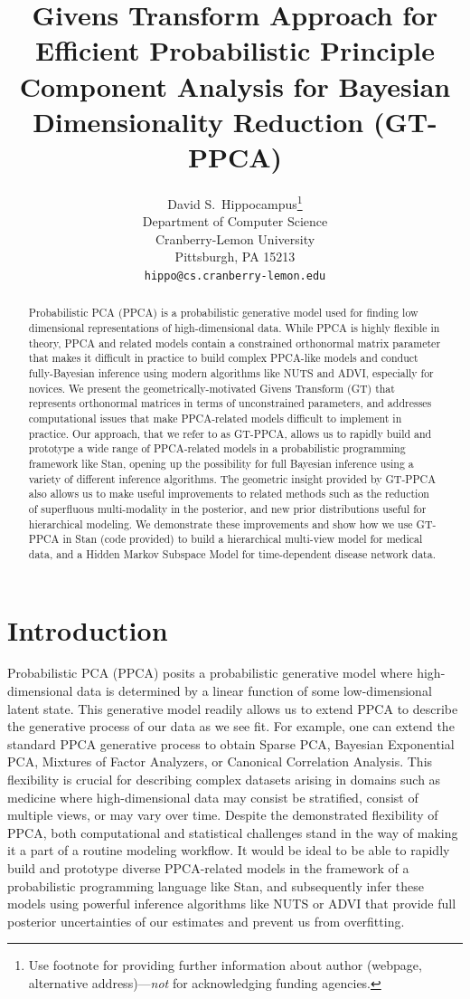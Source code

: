 \documentclass{article}
\title{Givens Transform Approach for Efficient Probabilistic Principle Component Analysis for Bayesian Dimensionality Reduction (GT-PPCA)}
\author{
  David S.~Hippocampus\thanks{Use footnote for providing further
    information about author (webpage, alternative
    address)---\emph{not} for acknowledging funding agencies.} \\
  Department of Computer Science\\
  Cranberry-Lemon University\\
  Pittsburgh, PA 15213 \\
  \texttt{hippo@cs.cranberry-lemon.edu} \\
}
\begin{document}

\maketitle

\begin{abstract}
Probabilistic PCA (PPCA) is a probabilistic generative model used for finding low dimensional representations of high-dimensional data. While PPCA is highly flexible in theory, PPCA and related models contain a constrained orthonormal matrix parameter that makes it difficult in practice to build complex PPCA-like models and conduct fully-Bayesian inference using modern algorithms like NUTS and ADVI, especially for novices. We present the geometrically-motivated Givens Transform (GT) that represents orthonormal matrices in terms of unconstrained parameters, and addresses computational issues that make PPCA-related models difficult to implement in practice. Our approach, that we refer to as GT-PPCA, allows us to rapidly build and prototype a wide range of PPCA-related models in a probabilistic programming framework like Stan, opening up the possibility for full Bayesian inference using a variety of different inference algorithms. The geometric insight provided by GT-PPCA also allows us to make useful improvements to related methods such as the reduction of superfluous multi-modality in the posterior, and new prior distributions useful for hierarchical modeling. We demonstrate these improvements and show how we use GT-PPCA in Stan (code provided) to build a hierarchical multi-view model for medical data, and a Hidden Markov Subspace Model for time-dependent disease network data.
\end{abstract}

\section{Introduction}

Probabilistic PCA (PPCA) \citep{tipping1999probabilistic} posits a probabilistic generative model where high-dimensional data is determined by a linear function of some low-dimensional latent state. This generative model readily allows us to extend PPCA to describe the generative process of our data as we see fit. For example, one can extend the standard PPCA generative process to obtain Sparse PCA, Bayesian Exponential PCA, Mixtures of Factor Analyzers, or Canonical Correlation Analysis. This flexibility is crucial for describing complex datasets arising in domains such as medicine where high-dimensional data may consist be stratified, consist of multiple views, or may vary over time. Despite the demonstrated flexibility of PPCA, both computational and statistical challenges stand in the way of making it a part of a routine modeling workflow. It would be ideal to be able to rapidly build and prototype diverse PPCA-related models in the framework of a probabilistic programming language like Stan, and subsequently infer these models using powerful inference algorithms like NUTS or ADVI that provide full posterior uncertainties of our estimates and prevent us from overfitting.
\end{document}
